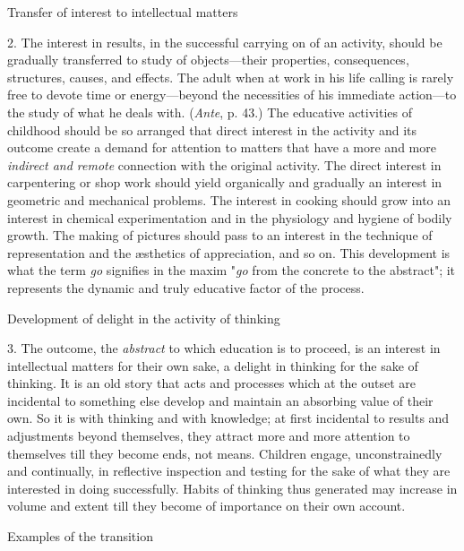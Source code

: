\documentclass[letterpaper]{book}
\begin{document}
Transfer of interest to intellectual matters

2. The interest in results, in the successful carrying on of an
activity, should be gradually transferred to
study
of objects---their properties, consequences, structures, causes, and
effects. The adult when at work in his life calling is rarely free to
devote time or energy---beyond the necessities of his immediate
action---to the study of what he deals with. (\emph{Ante}, p. 43.) The
educative activities of childhood should be so arranged that direct
interest in the activity and its outcome create a demand for attention
to matters that have a more and more \emph{indirect and remote}
connection with the original activity. The direct interest in
carpentering or shop work should yield organically and gradually an
interest in geometric and mechanical problems. The interest in cooking
should grow into an interest in chemical experimentation and in the
physiology and hygiene of bodily growth. The making of pictures should
pass to an interest in the technique of representation and the æsthetics
of appreciation, and so on. This development is what the term \emph{go}
signifies in the maxim "\emph{go} from the concrete to the abstract"; it
represents the dynamic and truly educative factor of the process.

Development of delight in the activity of thinking

3. The outcome, the \emph{abstract} to which education is to proceed, is
an interest in intellectual matters for their own sake, a delight in
thinking for the sake of thinking. It is an old story that acts and
processes which at the outset are incidental to something else develop
and maintain an absorbing value of their own. So it is with thinking and
with knowledge; at first incidental to results and adjustments beyond
themselves, they attract more and more attention to themselves till they
become ends, not means. Children engage, unconstrainedly and
continually, in reflective inspection and testing for the sake of what
they are interested in doing successfully. Habits of thinking thus
generated may increase in
volume
and extent till they become of importance on their own account.

Examples of the transition
\end{document}
